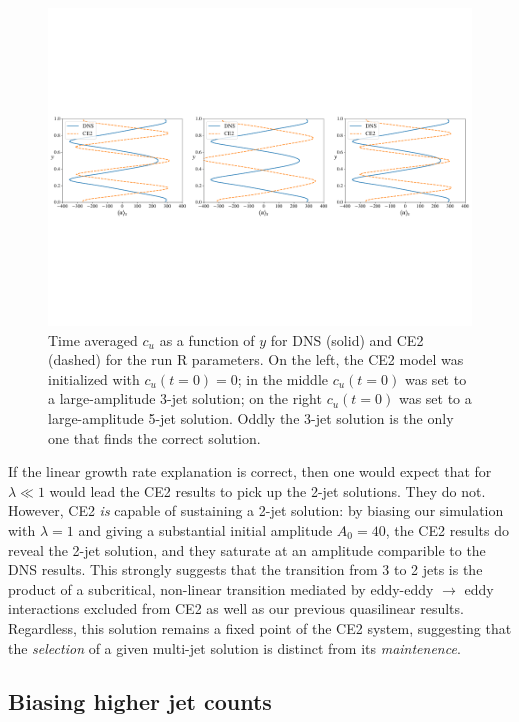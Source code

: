 \documentclass{jfm}
\begin{document}
\begin{figure}[h]
  \centering
  \includegraphics[width=\textwidth]{../../figs/umean_dns_ce2_runRST.pdf}
  \caption{Time averaged $c_u$ as a function of $y$ for DNS (solid) and CE2 (dashed) for the run R parameters. On the left, the CE2 model was initialized with $c_u(t=0) = 0$; in the middle $c_u(t=0)$ was set to a large-amplitude 3-jet solution; on the right $c_u(t=0)$ was set to a large-amplitude 5-jet solution. Oddly the 3-jet solution is the only one that finds the correct solution.}
  \label{fig:cu_vs_y_runA}
\end{figure}

If the linear growth rate explanation is correct, then one would expect that for $\lambda \ll 1$ would lead the CE2 results to pick up the 2-jet solutions.
They do not.
However, CE2 \emph{is} capable of sustaining a 2-jet solution:
by biasing our simulation with $\lambda = 1$ and giving a substantial initial amplitude $A_0 = 40$, the CE2 results do reveal the 2-jet solution, and they saturate at an amplitude comparible to the DNS results.
This strongly suggests that the transition from 3 to 2 jets is the product of a subcritical, non-linear transition mediated by eddy-eddy $\to$ eddy interactions excluded from CE2 as well as our previous quasilinear results.
Regardless, this solution remains a fixed point of the CE2 system, suggesting that the \emph{selection} of a given multi-jet solution is distinct from its \emph{maintenence}.



\subsection{Biasing higher jet counts}
\label{sec:higher_jet}
\end{document}
